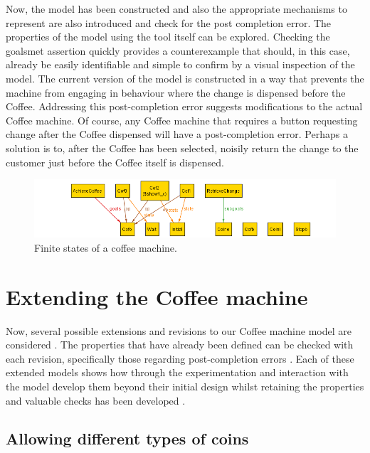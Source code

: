 \documentclass[a4paper,10pt]{report}
\begin{document}
Now, the model has been constructed and also the appropriate mechanisms to represent are also introduced and check for the post completion error. The properties of the model using the tool itself can be explored. Checking the goalsmet assertion quickly provides a counterexample that should, in this case, already be easily identifiable and simple to confirm by a visual inspection of the model. The current version of the model is constructed in a way that prevents the machine from engaging in behaviour where the change is dispensed before the Coffee. Addressing this post-completion error suggests modifications to the actual Coffee machine. Of course, any Coffee machine that requires a button requesting change after the Coffee dispensed will have a post-completion error. Perhaps a solution is to, after the Coffee has been selected, noisily return the change to the customer just before the Coffee itself is dispensed.

\begin{figure}[h!]
 \centering
  \includegraphics[width= 1\textwidth]{viz1.png}
\caption{Finite states of a coffee machine.}
 \end{figure}
 
 \section{Extending the Coffee machine}
\label{Cofee machine ext}

Now, several possible extensions and revisions to our Coffee machine model are considered \cite{Boyatt}. The properties that have already been defined can be checked with each revision, specifically those regarding post-completion errors \cite{Boyatt}. Each of these extended models shows how through the experimentation and interaction with the model develop them beyond their initial design whilst retaining the properties and valuable checks has been developed \cite{Boyatt}.

\subsection{Allowing different types of coins}
\label{Allowing different types coins}
\end{document}
